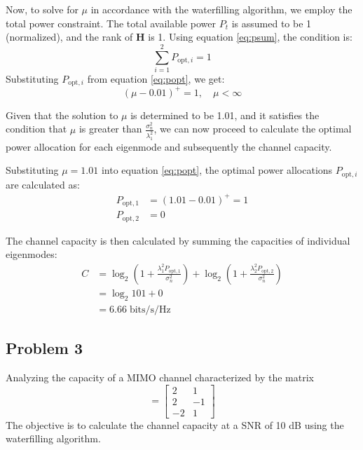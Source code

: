 \documentclass[lettersize,journal]{IEEEtran}
\begin{document}
Now, to solve for \( \mu \) in accordance with the waterfilling algorithm, we employ the total power constraint. The total available power \( P_t \) is assumed to be 1 (normalized), and the rank of \( \mathbf{H} \) is 1. Using equation \eqref{eq:psum}, the condition is:
\begin{equation}
\sum_{i=1}^{2} P_{\text{opt},i} = 1
\end{equation}
Substituting \( P_{\text{opt},i} \) from equation \eqref{eq:popt}, we get:
\begin{equation}
\left( \mu - 0.01 \right)^+ = 1, \quad \mu < \infty
\end{equation}

Given that the solution to \( \mu \) is determined to be 1.01, and it satisfies the condition that \( \mu \) is greater than \( \frac{\sigma_n^2}{\lambda_1^2} \), we can now proceed to calculate the optimal power allocation for each eigenmode and subsequently the channel capacity.

Substituting \( \mu = 1.01 \) into equation \eqref{eq:popt}, the optimal power allocations \( P_{\text{opt},i} \) are calculated as:
\begin{equation}
\begin{aligned}
P_{\text{opt},1} &= \left( 1.01 - 0.01 \right)^+ = 1 \\
P_{\text{opt},2} &= 0
\end{aligned}
\end{equation}

The channel capacity is then calculated by summing the capacities of individual eigenmodes:
\begin{equation}
\begin{aligned}
C &= \log_2\left(1 + \frac{\lambda_1^2 P_{\text{opt},1}}{\sigma_n^2}\right) + \log_2\left(1 + \frac{\lambda_2^2 P_{\text{opt},2}}{\sigma_n^2}\right)\\
&= \log_2 101 + 0\\
&= 6.66 \; \text{bits/s/Hz}
\end{aligned}
\end{equation}

\subsection{Problem 3}
Analyzing the capacity of a MIMO channel characterized by the matrix
\begin{equation}
 = \begin{bmatrix}
2 & 1 \\
2 & -1 \\
-2 & 1 \end{bmatrix}
\end{equation}
The objective is to calculate the channel capacity at a SNR of 10 dB using the waterfilling algorithm.
\end{document}
